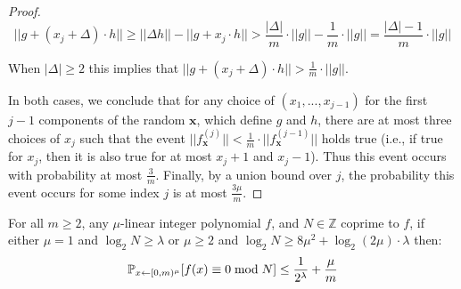 \begin{proof}
$$||g + (x_j + \Delta) \cdot h|| \geq || \Delta h|| - ||g + x_j \cdot h|| > \frac{|\Delta|}{m} \cdot ||g||  - \frac{1}{m} \cdot ||g||  = \frac{|\Delta| -1}{m} \cdot ||g||$$ 

When $|\Delta| \geq 2$ this implies that $||g + (x_j + \Delta) \cdot h|| > \frac{1}{m} \cdot ||g||$.  

In both cases, we conclude that for any choice of $(x_1,...,x_{j-1})$ for the first $j-1$ components of the random $\mathbf{x}$, which define $g$ and $h$, there are at most three choices of $x_j$ such that the event $||f_{\mathbf{x}}^{(j)}|| < \frac{1}{m} \cdot ||f_{\mathbf{x}}^{(j-1)}||$ holds true  (i.e., if true for $x_j$, then it is also true for at most $x_j + 1$ and $x_j - 1$). Thus this event occurs with probability at most $\frac{3}{m}$. Finally, by a union bound over $j$, the probability this event occurs for some index $j$ is at most $\frac{3\mu}{m}$. 


 \end{proof}
 
 \begin{lemma}
 \label{lem:CSZ}
 For all $m \geq 2$, any $\mu$-linear integer polynomial $f$, and $N \in \mathbb{Z}$ coprime to $f$, if either $\mu = 1$ and $ \log_2 N \geq \lambda$ or $\mu \geq 2$ and $\log_2 N\geq 8 \mu^2 + \log_2(2\mu)\cdot \lambda$ then:
 $$\mathbb{P}_{x\gets [0,m)^\mu} [f(x)\equiv 0 \bmod N]\leq \frac{1}{2^{\lambda}} + \frac{\mu}{m}$$
 \end{lemma} 
 
